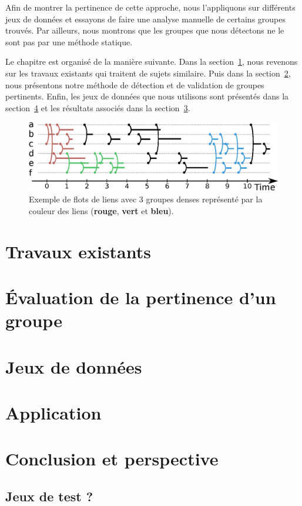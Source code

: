 Afin de montrer la pertinence de cette approche, nous l'appliquons sur différents jeux de données et essayons de faire une analyse manuelle de certains groupes trouvés.
Par ailleurs, nous montrons que les groupes que nous détectons ne le sont pas par une méthode statique.

Le chapitre est organisé de la manière suivante.
Dans la section~\ref{sec:groupe_dense_existant}, nous revenons sur les travaux existants qui traitent de sujets similaire.
Puis dans la section~\ref{sec:groupe_dense_method}, nous présentons notre méthode de détection et de validation de groupes pertinents.
Enfin, les jeux de données que nous utilisons sont présentés dans la section~\ref{sec:groupe_dense_result} et les résultats associés dans la section~\ref{sec:groupe_dense_data}.

\begin{figure}
\centering
\includegraphics[width=\linewidth]{img/GroupeDense/GroupExample/Zone_dense.eps}
\caption{Exemple de flots de liens avec 3 groupes denses représenté par la couleur des liens (\textcolor{brique}{\textbf{rouge}}, \textcolor{vert_turquoise}{\textbf{vert}} et \textcolor{bleu_window}{\textbf{bleu}}).
}
\label{fig:exemple_groupe_dens}
\end{figure}

\section{Travaux existants}
\label{sec:groupe_dense_existant}


\section{\'Evaluation de la pertinence d'un groupe}
\label{sec:groupe_dense_method}

\section{Jeux de données}
\label{sec:groupe_dense_data}
\section{Application}
\label{sec:groupe_dense_result}



\section{Conclusion et perspective}


\subsection{Jeux de test ?}